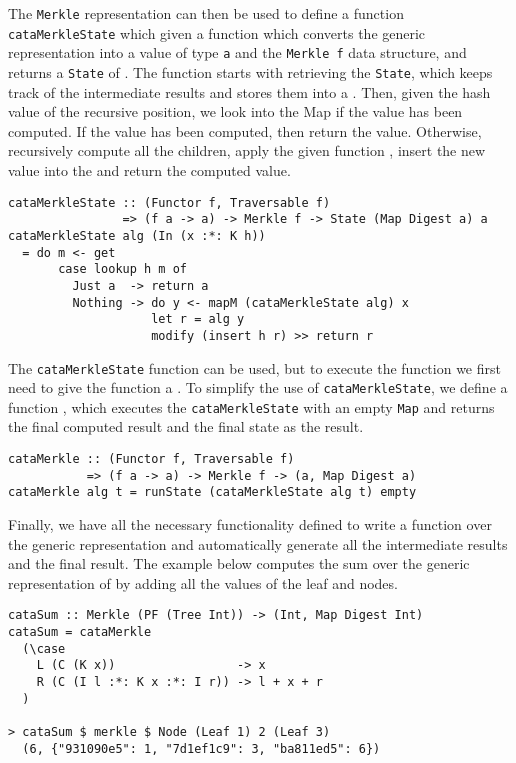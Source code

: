 The \texttt{Merkle} representation can then be used to define a function \texttt{cataMerkleState} which given a function  which converts the generic representation  into a value of type \texttt{a} and the \texttt{Merkle f} data structure, and returns a \texttt{State} of . The  function starts with retrieving the \texttt{State}, which keeps track of the intermediate results and stores them into a . Then, given the hash value of the recursive position, we look into the Map if the value has been computed. If the value has been computed, then return the value. Otherwise, recursively compute all the children, apply the given function , insert the new value into the  and return the computed value.

\begin{verbatim}
cataMerkleState :: (Functor f, Traversable f)
                => (f a -> a) -> Merkle f -> State (Map Digest a) a
cataMerkleState alg (In (x :*: K h)) 
  = do m <- get
       case lookup h m of
         Just a  -> return a
         Nothing -> do y <- mapM (cataMerkleState alg) x
                    let r = alg y
                    modify (insert h r) >> return r
\end{verbatim}

The \texttt{cataMerkleState} function can be used, but to execute the function we first need to give the function a . To simplify the use of \texttt{cataMerkleState}, we define a function , which executes the \texttt{cataMerkleState} with an empty \texttt{Map} and returns the final computed result and the final state as the result. 

\begin{verbatim}
cataMerkle :: (Functor f, Traversable f)
           => (f a -> a) -> Merkle f -> (a, Map Digest a)
cataMerkle alg t = runState (cataMerkleState alg t) empty
\end{verbatim}

Finally, we have all the necessary functionality defined to write a function over the generic representation and automatically generate all the intermediate results and the final result. The example below computes the sum over the generic representation of  by adding all the values of the leaf and nodes. 

\begin{verbatim}
cataSum :: Merkle (PF (Tree Int)) -> (Int, Map Digest Int)
cataSum = cataMerkle
  (\case
    L (C (K x))                 -> x
    R (C (I l :*: K x :*: I r)) -> l + x + r
  )

> cataSum $ merkle $ Node (Leaf 1) 2 (Leaf 3)
  (6, {"931090e5": 1, "7d1ef1c9": 3, "ba811ed5": 6})
\end{verbatim}

